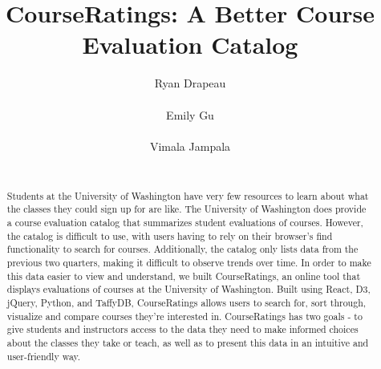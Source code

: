 \documentclass{chi2009}
\begin{document}
\setlength{\paperheight}{11in}
\setlength{\paperwidth}{8.5in}
\setlength{\pdfpageheight}{\paperheight}
\setlength{\pdfpagewidth}{\paperwidth}


\title{CourseRatings: A Better Course Evaluation Catalog}
\author{
  \alignauthor Ryan Drapeau\\
    \\
  \alignauthor Emily Gu\\
    \\
  \alignauthor Vimala Jampala\\
    \\
}

\maketitle

\begin{abstract}
Students at the University of Washington have very few resources to learn about what the classes they could sign up for are like. The University of Washington does provide a course evaluation catalog that summarizes student evaluations of courses. However, the catalog is difficult to use, with users having to rely on their browser's find functionality to search for courses. Additionally, the catalog only lists data from the previous two quarters, making it difficult to observe trends over time. In order to make this data easier to view and understand, we built CourseRatings, an online tool that displays evaluations of courses at the University of Washington. Built using React, D3, jQuery, Python, and TaffyDB, CourseRatings allows users to search for, sort through, visualize and compare courses they're interested in. CourseRatings has two goals - to give students and instructors access to the data they need to make informed choices about the classes they take or teach, as well as to present this data in an intuitive and user-friendly way.
\end{abstract}
\end{document}
